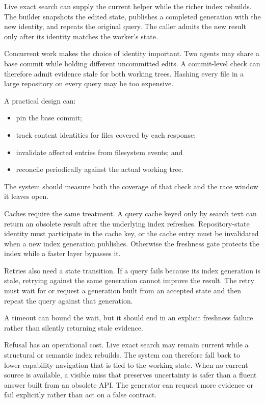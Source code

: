 Live exact search can supply the current helper while the richer index rebuilds. The builder snapshots the edited state, publishes a completed generation with the new identity, and repeats the original query. The caller admits the new result only after its identity matches the worker's state.

Concurrent work makes the choice of identity important. Two agents may share a base commit while holding different uncommitted edits. A commit-level check can therefore admit evidence stale for both working trees. Hashing every file in a large repository on every query may be too expensive.


A practical design can:

\begin{itemize}
\tightlist
\item
  pin the base commit;
\item
  track content identities for files covered by each response;
\item
  invalidate affected entries from filesystem events; and
\item
  reconcile periodically against the actual working tree.
\end{itemize}

The system should measure both the coverage of that check and the race window it leaves open.

Caches require the same treatment. A query cache keyed only by search text can return an obsolete result after the underlying index refreshes. Repository-state identity must participate in the cache key, or the cache entry must be invalidated when a new index generation publishes. Otherwise the freshness gate protects the index while a faster layer bypasses it.

Retries also need a state transition. If a query fails because its index generation is stale, retrying against the same generation cannot improve the result. The retry must wait for or request a generation built from an accepted state and then repeat the query against that generation.

A timeout can bound the wait, but it should end in an explicit freshness failure rather than silently returning stale evidence.

Refusal has an operational cost. Live exact search may remain current while a structural or semantic index rebuilds. The system can therefore fall back to lower-capability navigation that is tied to the working state. When no current source is available, a visible miss that preserves uncertainty is safer than a fluent answer built from an obsolete API. The generator can request more evidence or fail explicitly rather than act on a false contract.

